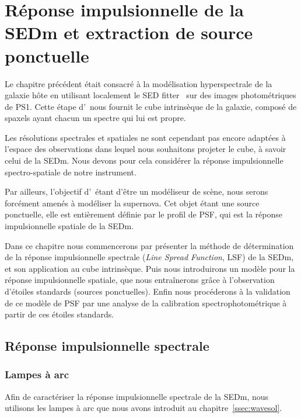 \documentclass[../main/main.tex]{subfiles}
\begin{document}
\setcounter{chapter}{6}
\chapter{Réponse impulsionnelle de la SEDm et extraction de source ponctuelle}\label{ch:irf}
\minitoc
\vspace{1cm}
Le chapitre précédent était consacré à la modélisation hyperspectrale de
la galaxie hôte en utilisant localement le SED fitter \cigale\ sur des
images photométriques de PS1. Cette étape d'\hypergal\ nous fournit le
cube intrinsèque de la galaxie, composé de spaxels ayant chacun un
spectre qui lui est propre.

Les résolutions spectrales et spatiales ne sont cependant pas encore
adaptées à l'espace des observations dans lequel nous souhaitons projeter
le cube, à savoir celui de la SEDm. Nous devons pour cela considérer la
réponse impulsionnelle spectro-spatiale de notre instrument.

Par ailleurs, l'objectif d'\hypergal\ étant d'être un modéliseur de
scène, nous serons forcément amenés à modéliser la supernova. Cet objet
étant une source ponctuelle, elle est entièrement définie par le profil
de PSF, qui est la réponse impulsionnelle spatiale de la SEDm.

Dans ce chapitre nous commencerons par présenter la méthode de
détermination de la réponse impulsionnelle spectrale (\textit{Line
  Spread Function}, LSF) de la SEDm,
et son application au cube intrinsèque. Puis nous introduirons un modèle
pour la réponse impulsionnelle spatiale, que nous
entraînerons grâce à l'observation d'étoiles standards (sources
ponctuelles). Enfin nous procéderons à la validation de ce modèle de PSF par
une analyse de la calibration spectrophotométrique à partir de ces
étoiles standards.
\newpage

\section{Réponse impulsionnelle spectrale}

\subsection{Lampes à arc}

Afin de caractériser la réponse impulsionnelle spectrale de la SEDm, nous
utilisons les lampes à arc que nous avons introduit au
chapitre~\ref{ssec:wavesol}.
\end{document}
